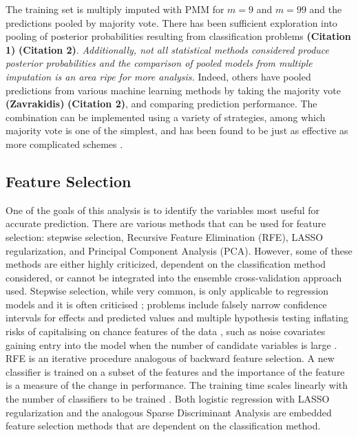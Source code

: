 \documentclass[12pt,]{article}
\begin{document}
The training set is multiply imputed with PMM for \(m=9\) and \(m=99\)
and the predictions pooled by majority vote. There has been sufficient
exploration into pooling of posterior probabilities resulting from
classification problems \textbf{(Citation 1)} \textbf{(Citation 2)}.
\emph{Additionally, not all statistical methods considered produce
posterior probabilities and the comparison of pooled models from
multiple imputation is an area ripe for more analysis.} Indeed, others
have pooled predictions from various machine learning methods by taking
the majority vote \textbf{(Zavrakidis)} \textbf{(Citation 2)}, and
comparing prediction performance. The combination can be implemented
using a variety of strategies, among which majority vote is one of the
simplest, and has been found to be just as effective as more complicated
schemes \citep{lam_optimal_1995}.

\subsection{Feature Selection}\label{feature-selection}

One of the goals of this analysis is to identify the variables most
useful for accurate prediction. There are various methods that can be
used for feature selection: stepwise selection, Recursive Feature
Elimination (RFE), LASSO regularization, and Principal Component
Analysis (PCA). However, some of these methods are either highly
criticized, dependent on the classification method considered, or cannot
be integrated into the ensemble cross-validation approach used. Stepwise
selection, while very common, is only applicable to regression models
and it is often criticised \citep{kemp_applied_2003}; problems include
falsely narrow confidence intervals for effects and predicted values
\citep{altman_bootstrap_1989} and multiple hypothesis testing inflating
risks of capitalising on chance features of the data
\citep{altman_practical_1991}, such as noise covariates gaining entry
into the model when the number of candidate variables is large
\citep{derksen_backward_1992}. RFE is an iterative procedure analogous
of backward feature selection. A new classifier is trained on a subset
of the features and the importance of the feature is a measure of the
change in performance. The training time scales linearly with the number
of classifiers to be trained \citep{guyon_gene_2002}. Both logistic
regression with LASSO regularization \citep{tibshirani_regression_1996}
and the analogous Sparse Discriminant Analysis
\citep{clemmensen_sparse_2011} are embedded feature selection methods
that are dependent on the classification method.
\end{document}
